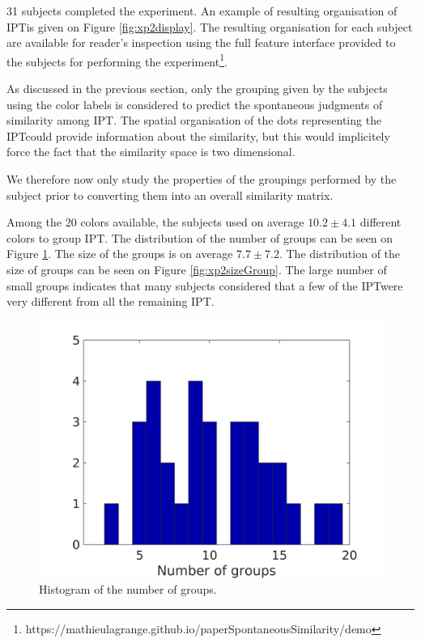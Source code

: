 \documentclass{article}
\newcommand{\ipt}{IPT}
\begin{document}
31 subjects completed the experiment. An example of resulting organisation of \ipt is given on Figure \ref{fig:xp2display}.  The resulting organisation for each subject are available for reader's inspection using the full feature interface provided to the subjects for performing the experiment\footnote{https://mathieulagrange.github.io/paperSpontaneousSimilarity/demo}.

As discussed in the previous section, only the grouping given by the subjects using the color labels is considered to predict the spontaneous judgments of similarity among \ipt. The spatial organisation of the dots representing the \ipt could provide information about the similarity, but this would implicitely force the fact that the similarity space is two dimensional.

We therefore now only study the properties of the groupings performed by the subject prior to converting them into an overall similarity matrix.

Among the 20 colors available, the subjects used on average $10.2 \pm  4.1$ different colors to group \ipt. The distribution of the number of groups can be seen on Figure \ref{fig:xp2nbGroup}. The size of the groups is on average $7.7 \pm   7.2$. The distribution of the size of groups can be seen on Figure \ref{fig:xp2sizeGroup}. The large number of small groups indicates that many subjects considered that a few of the \ipt were very different from all the remaining \ipt.

\begin{figure}
\center
\includegraphics[width = \textwidth]{figures/nbc.png}
\caption{Histogram of the number of groups.}
\label{fig:xp2nbGroup}
\end{figure}
\end{document}
